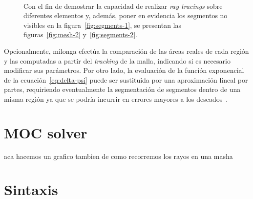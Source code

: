 \documentclass[11pt]{article}
\numberwithin{equation}{section}
\begin{document}
\begin{figure}[!h]
 \begin{center}
  \\
  \caption{Con el fin de demostrar la capacidad de realizar \emph{ray tracings} sobre diferentes elementos y, además, poner en evidencia los segmentos no visibles en la figura~\ref{fig:segments-1}, se presentan las figuras~\ref{fig:mesh-2} y~\ref{fig:segments-2}.}
  \label{fig:mesh-and-segments-2}
 \end{center}
\end{figure}

Opcionalmente, milonga efectúa la comparación de las áreas reales de cada región y las computadas a partir del \emph{tracking} de la malla, indicando si es necesario modificar sus parámetros. Por otro lado, la evaluación de la función exponencial de la ecuación~\eqref{eq:delta-psi} puede ser sustituida por una aproximación lineal por partes, requiriendo eventualmente la segmentación de segmentos dentro de una misma región ya que se podría incurrir en errores mayores a los deseados~\cite{openmoc2014}.


\section{MOC solver}
aca hacemos un grafico tambien de como recorremos los rayos en una masha

\section{Sintaxis}
\end{document}
